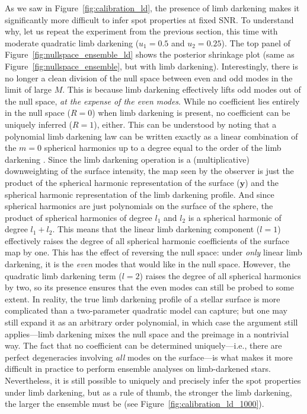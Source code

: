 \documentclass[modern]{aastex62}
\begin{document}
As we saw in Figure~\ref{fig:calibration_ld}, the presence of limb darkening
makes it significantly more difficult to infer spot properties at fixed
SNR. To understand
why, let us repeat the experiment from the previous section,
this time with moderate quadratic limb darkening ($u_1 = 0.5$ and $u_2 = 0.25$).
The top panel of Figure~\ref{fig:nullspace_ensemble_ld} shows the
posterior shrinkage plot (same as Figure~\ref{fig:nullspace_ensemble}, but
with limb darkening). Interestingly, there is no longer a clean division of
the null space between even and odd modes in the limit of large $M$.
This is because limb darkening effectively lifts odd modes out of the null space, \emph{at the
    expense of the even modes}. While no coefficient lies entirely in the
null space ($R = 0$) when limb darkening is present, no coefficient
can be uniquely inferred ($R = 1$), either. This can be understood by noting that
a polynomial limb darkening law can be written
exactly as a linear combination of the $m=0$ spherical harmonics
up to a degree equal to the order of the limb darkening
\citep[in this case, $l = 2$;][and Appendix~\ref{sec:ld}]{Luger2019,Agol2020}.
Since the limb darkening operation is a (multiplicative) downweighting of
the surface intensity, the map seen by the observer is just the product
of the spherical harmonic representation of the surface ($\mathbf{y}$)
and the spherical harmonic representation of the limb darkening profile.
And since spherical harmonics are just polynomials on the surface of the sphere,
the product of spherical harmonics of degree $l_1$ and $l_2$ is a spherical
harmonic of degree $l_1 + l_2$. This means that the linear limb darkening
component ($l = 1$) effectively raises the degree of all spherical harmonic
coefficients of the surface map by one. This has the effect of reversing
the null space: under \emph{only} linear limb darkening, it is the \emph{even}
modes that would like in the null space. However, the quadratic
limb darkening term ($l = 2$) raises the degree of all spherical harmonics by two,
so its presence ensures that the even modes can still be probed to some extent.
In reality, the true limb darkening profile of a stellar surface is more
complicated than a two-parameter quadratic model can capture; but one may still
expand it as an arbitrary order polynomial, in which case the argument still
applies---limb darkening mixes the null space and the preimage in a nontrivial
way. The fact that no coefficient can be determined uniquely---i.e., there are
perfect degeneracies involving \emph{all} modes on the surface---is what makes it more
difficult in practice to perform ensemble analyses on limb-darkened stars.
Nevertheless, it is still possible to uniquely and precisely infer the spot properties
under limb darkening,
but as a rule of thumb, the stronger the limb darkening, the larger the
ensemble must be (see Figure~\ref{fig:calibration_ld_1000}).
\end{document}

